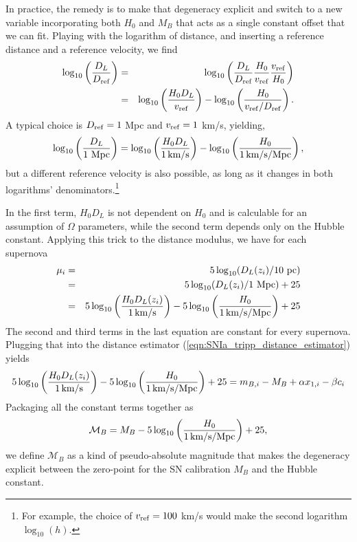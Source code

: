 In practice, the remedy is to make that degeneracy explicit and switch to a new variable incorporating both $H_0$ and $M_B$ that acts as a single constant offset that we can fit.  Playing with the logarithm of distance, and inserting a reference distance and a reference velocity, we find
\begin{eqnarray}
  \log_{10}\left(\frac{D_L}{D_{\rm ref}} \right) &=& \log_{10}\left( \frac{D_L}{D_{\rm ref}} \frac{H_0}{v_{\rm ref}} \frac{v_{\rm ref}}{H_0}    \right) \\ \nonumber
    &=&  \log_{10}\left(  \frac{H_0 D_L}{v_{\rm ref}} \right) -\log_{10}\left( \frac{H_0}{v_{\rm ref}/D_{\rm ref}} \right).
\end{eqnarray}
A typical choice is $D_{\rm ref} = 1$ Mpc and $v_{\rm ref} = 1$ km/s, yielding,
\begin{equation}
  \log_{10}\left(\frac{D_L}{\mbox{1 Mpc}} \right)  =  \log_{10}\left(  \frac{H_0 D_L}{\mbox{1\,km/s}} \right) -\log_{10}\left( \frac{H_0}{\mbox{1\,km/s/Mpc}} \right),
\end{equation}
but a different reference velocity is also possible, as long as it changes in both logarithms' denominators.\footnote{For example, the choice of $v_{\rm ref} = 100$ km/s would make the second logarithm $\log_{10}(h)$.}

In the first term, $H_0 D_L$ is not dependent on $H_0$ and is calculable for an assumption of $\Omega$ parameters, while the second term depends only on the Hubble constant.  Applying this trick to the distance modulus, we have for each supernova
\begin{eqnarray}
  \mu_i &=& 5 \log_{10}(D_L(z_i)/\mbox{10 pc}) \\ \nonumber
  &=& 5 \log_{10}(D_L(z_i)/\mbox{1 Mpc}) + 25 \\ \nonumber
  &=&  5 \log_{10} \left(  \frac{H_0 D_L(z_i)}{\mbox{1\,km/s}} \right)
  - 5\log_{10}\left( \frac{H_0}{\mbox{1\,km/s/Mpc}} \right)
  + 25
\end{eqnarray}
The second and third terms in the last equation are constant for every supernova.  Plugging that into the distance estimator (\ref{eqn:SNIa_tripp_distance_estimator}) yields
\begin{equation}
  5 \log_{10} \left(  \frac{H_0 D_L(z_i)}{\mbox{1\,km/s}} \right)
  - 5\log_{10}\left( \frac{H_0}{\mbox{1\,km/s/Mpc}} \right)
  + 25
  = m_{B,i} - {M}_B + \alpha x_{1,i} - \beta c_i
\end{equation}
Packaging all the constant terms together as
\begin{equation}
  \mathcal{M}_B = M_B - 5\log_{10}\left( \frac{H_0}{\mbox{1\,km/s/Mpc}} \right)
  + 25,
\end{equation}
we define $\mathcal{M}_B$ as a kind of pseudo-absolute magnitude that makes the degeneracy explicit between the zero-point for the SN calibration $M_B$ and the Hubble constant.

